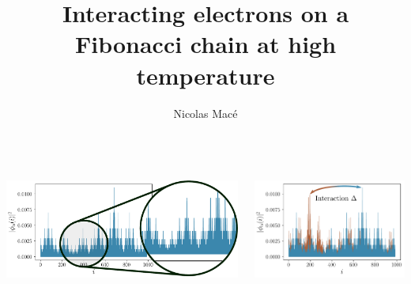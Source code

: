 \begin{frame}
\title{Interacting electrons on a Fibonacci chain at high temperature}
\author{Nicolas Macé}
\date{}
%
\titlepage
%
\btVFill
\begin{columns}
\begin{column}{0.6\textwidth}
\centering
%
\includegraphics[height=3.5cm]{img/0_cover/one_density_zoom}
\end{column}
\begin{column}{0.4\textwidth}
\centering
\includegraphics[height=3.5cm]{img/0_cover/free_two_densities_interaction}
\end{column}
\end{columns}
\end{frame}
